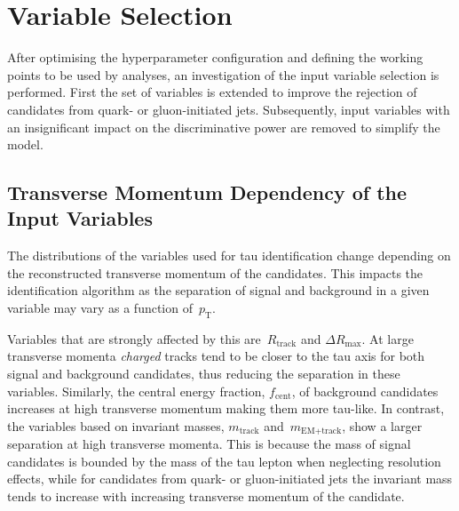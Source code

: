 \section{Variable Selection}
\label{sec:bdt_variable_selection}

After optimising the hyperparameter configuration and defining the working
points to be used by analyses, an investigation of the input variable selection
is performed. First the set of variables is extended to improve the rejection of
\tauhadvis candidates from quark- or gluon-initiated jets. Subsequently, input
variables with an insignificant impact on the discriminative power are removed
to simplify the model.

\subsection{Transverse Momentum Dependency of the Input Variables}
\label{sec:bdt_incl_pt}


The distributions of the variables used for tau identification change depending
on the reconstructed transverse momentum of the \tauhadvis candidates. This
impacts the identification algorithm as the separation of signal and background
in a given variable may vary as a function of~$p_\text{T}$.

Variables that are strongly affected by this are~$R_\text{track}$ and
$\Delta R_\text{max}$. At large transverse momenta \emph{charged} tracks tend to
be closer to the tau axis for both signal and background candidates, thus
reducing the separation in these variables. Similarly, the central energy
fraction, $f_\text{cent}$, of background candidates increases at high transverse
momentum making them more tau-like. In contrast, the variables based on
invariant masses, $m_\text{track}$ and~$m_\text{EM+track}$, show a larger
separation at high transverse momenta. This is because the mass of signal
candidates is bounded by the mass of the tau lepton when neglecting resolution
effects, while for candidates from quark- or gluon-initiated jets the invariant
mass tends to increase with increasing transverse momentum of the \tauhadvis
candidate. 

